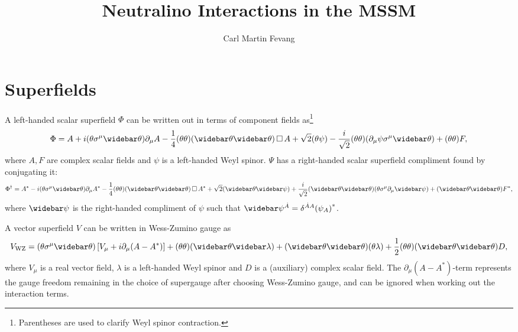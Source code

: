 \documentclass[english, notitlepage]{article}
\title{Neutralino Interactions in the MSSM}
\author{Carl Martin Fevang}
\begin{document}
\maketitle

\section{Superfields}
    A left-handed scalar superfield $\Phi$ can be written out in terms of component
    fields as\footnote{Parentheses are used to clarify Weyl spinor contraction.}
    \begin{align}
        \Phi = A + i(\theta\sigma^\mu\wbar\theta) \partial_\mu A - \frac{1}{4} (\theta\theta)(\wbar\theta\wbar\theta) \dA A +
        \sqrt{2} (\theta\psi) - \frac{i}{\sqrt{2}} (\theta\theta) (\partial_\mu \psi \sigma^\mu \wbar\theta) + (\theta\theta) F,
    \end{align}
    where $A, F$ are complex scalar fields and $\psi$ is a left-handed Weyl spinor. $\Psi$ has a right-handed scalar superfield compliment found by conjugating it:
    \begin{align}
        \Phi^\dag = A^* - i(\theta\sigma^\mu\wbar\theta) \partial_\mu A^* - \frac{1}{4} (\theta\theta)(\wbar\theta\wbar\theta) \dA A^* +
        \sqrt{2} (\wbar\theta\wbar\psi) + \frac{i}{\sqrt{2}} (\wbar\theta\wbar\theta)
        (\theta \sigma^\mu \partial_\mu \wbar\psi) + (\wbar\theta\wbar\theta) F^*,
    \end{align}
    where $\wbar\psi$ is the right-handed compliment of $\psi$ such that $\wbar\psi^{\dot A} = \delta^{\dot A A} {(\psi_A)}^*$.

    A vector superfield $V$ can be written in Wess-Zumino gauge as
    \begin{align}
        \msub{V}{WZ} = (\theta\sigma^\mu\wbar\theta) \bclosed{V_\mu + i\partial_\mu (A - A^*)} + (\theta\theta) (\wbar\theta\wbar\lambda) +
        (\wbar\theta\wbar\theta)(\theta\lambda) + \frac{1}{2}
        (\theta\theta)(\wbar\theta\wbar\theta) D,
    \end{align}
    where $V_\mu$ is a real vector field, $\lambda$ is a left-handed Weyl spinor and $D$ is a (auxiliary) complex scalar field. The $\partial_\mu (A-A^*)$-term represents the gauge freedom remaining in the choice of
    supergauge after choosing Wess-Zumino gauge, and can be ignored when working
    out the interaction terms.
\end{document}
